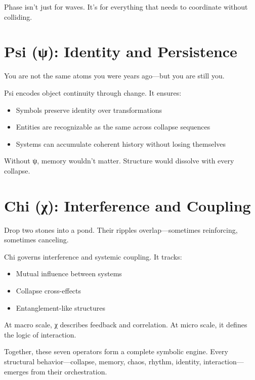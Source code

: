 Phase isn't just for waves. It's for everything that needs to coordinate without colliding.

\section{Psi (ψ): Identity and Persistence}

You are not the same atoms you were years ago—but you are still you.

Psi encodes object continuity through change. It ensures:
\begin{itemize}
\item Symbols preserve identity over transformations
\item Entities are recognizable as the same across collapse sequences
\item Systems can accumulate coherent history without losing themselves
\end{itemize}

Without ψ, memory wouldn’t matter. Structure would dissolve with every collapse.

\section{Chi (χ): Interference and Coupling}

Drop two stones into a pond. Their ripples overlap—sometimes reinforcing, sometimes canceling.

Chi governs interference and systemic coupling. It tracks:
\begin{itemize}
\item Mutual influence between systems
\item Collapse cross-effects
\item Entanglement-like structures
\end{itemize}

At macro scale, χ describes feedback and correlation. At micro scale, it defines the logic of interaction.

\bigskip

Together, these seven operators form a complete symbolic engine. Every structural behavior—collapse, memory, chaos, rhythm, identity, interaction—emerges from their orchestration.
